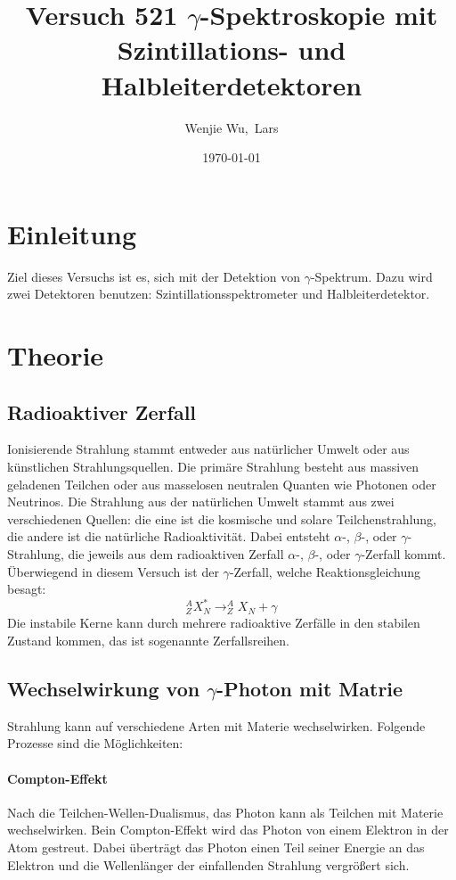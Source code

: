 \documentclass[ngerman,11pt]{article}
\title{Versuch 521 $\gamma$-Spektroskopie mit Szintillations- und Halbleiterdetektoren}
\author{Wenjie Wu,~Lars }
\date{\today}
\begin{document}
	\maketitle
	\begin{abstract}

	\end{abstract}
	\begin{multicols}{2}
		\section{Einleitung}
		Ziel dieses Versuchs ist es, sich mit der Detektion von $\gamma$-Spektrum. Dazu wird zwei Detektoren benutzen: Szintillationsspektrometer und  Halbleiterdetektor.
		\section{Theorie}
		\subsection{Radioaktiver Zerfall}
		Ionisierende Strahlung stammt entweder aus natürlicher Umwelt oder aus künstlichen Strahlungsquellen. Die primäre Strahlung besteht aus massiven geladenen Teilchen oder aus masselosen neutralen Quanten wie Photonen oder Neutrinos. Die Strahlung aus der natürlichen Umwelt stammt aus zwei verschiedenen Quellen: die eine ist die kosmische und solare Teilchenstrahlung, die andere ist die natürliche Radioaktivität. Dabei entsteht $\alpha$-, $\beta$-, oder $\gamma$-Strahlung, die jeweils aus dem radioaktiven Zerfall $\alpha$-, $\beta$-, oder $\gamma$-Zerfall kommt. Überwiegend in diesem Versuch ist der $\gamma$-Zerfall, welche Reaktionsgleichung besagt:
		\[
		^A_ZX^*_N\rightarrow ^A_ZX_N+\gamma
		\] 
		Die instabile Kerne kann durch mehrere radioaktive Zerfälle in den stabilen Zustand kommen, das ist sogenannte Zerfallsreihen.
		\subsection{Wechselwirkung von $\gamma$-Photon mit Matrie}
		Strahlung kann auf verschiedene Arten mit Materie wechselwirken. Folgende Prozesse sind die M\"oglichkeiten:
		\paragraph{Compton-Effekt} 
		Nach die Teilchen-Wellen-Dualismus, das Photon kann als Teilchen mit Materie wechselwirken. Bein Compton-Effekt wird das Photon von einem Elektron in der Atom gestreut. Dabei \"ubertr\"agt das Photon einen Teil seiner Energie an das Elektron und die Wellenl\"anger der einfallenden Strahlung vergr\"o\ss ert sich.

\end{multicols}
\end{document}

